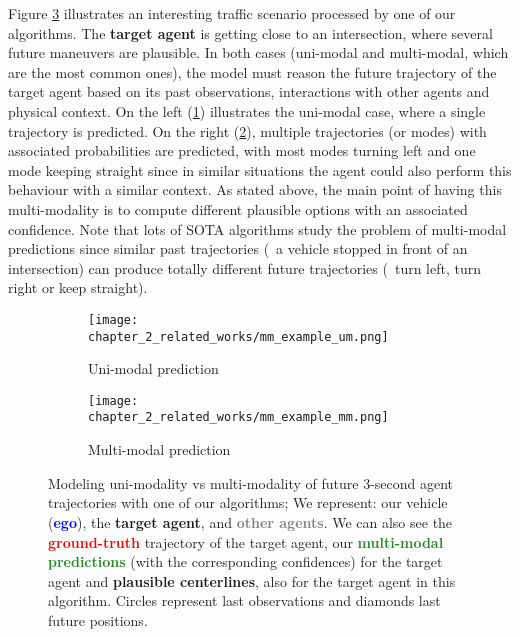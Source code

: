 Figure \ref{fig:chapter_2_related_works/um_vs_mm_mp} illustrates an interesting traffic scenario processed by one of our algorithms. The \textbf{\textcolor{YellowOrange}{target agent}} is getting close to an intersection, where several future maneuvers are plausible. In both cases (uni-modal and multi-modal, which are the most common ones), the model must reason the future trajectory of the target agent based on its past observations, interactions with other agents and physical context. On the left (\ref{subfig:chapter_2_related_works/um_vs_mm_mp_a}) illustrates the uni-modal case, where a single trajectory is predicted. On the right (\ref{subfig:chapter_2_related_works/um_vs_mm_mp_b}), multiple trajectories (or modes) with associated probabilities are predicted, with most modes turning left and one mode keeping straight since in similar situations the agent could also perform this behaviour with a similar context. As stated above, the main point of having this multi-modality is to compute different plausible options with an associated confidence. Note that lots of \ac{SOTA} algorithms study the problem of multi-modal predictions since similar past trajectories (\eg \ a vehicle stopped in front of an intersection) can produce totally different future trajectories (\eg \ turn left, turn right or keep straight).

\begin{figure}[t!]
	\begin{subfigure}{0.5\textwidth}
		\texttt{[image: chapter\_2\_related\_works/mm\_example\_um.png]}
		\caption{Uni-modal prediction}
		\label{subfig:chapter_2_related_works/um_vs_mm_mp_a}
	\end{subfigure}
	\hfill
	\begin{subfigure}{0.5\textwidth}
		\texttt{[image: chapter\_2\_related\_works/mm\_example\_mm.png]}
		\caption{Multi-modal prediction}
		\label{subfig:chapter_2_related_works/um_vs_mm_mp_b}
	\end{subfigure}
	\captionsetup{justification=justified}
	\caption[Modeling uni-modality vs multi-modality of future $3$-second agent trajectories with one of our algorithms]{Modeling uni-modality vs multi-modality of future $3$-second agent trajectories with one of our algorithms; We represent: our vehicle (\textbf{\textcolor{blue}{ego}}), the \textbf{\textcolor{YellowOrange}{target agent}}, and \textbf{\textcolor{gray}{other agents}}. We can also see the \textbf{\textcolor{red}{ground-truth}} trajectory of the target agent, our \textbf{\textcolor{ForestGreen}{multi-modal predictions}} (with the corresponding confidences) for the target agent and \textbf{plausible centerlines}, also for the target agent in this algorithm. Circles represent last observations and diamonds last future positions.}
	\label{fig:chapter_2_related_works/um_vs_mm_mp}
\end{figure}

